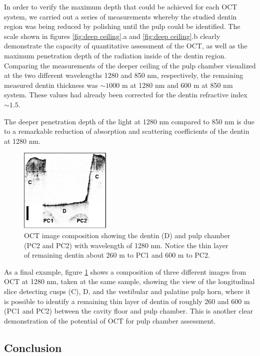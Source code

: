 \documentclass[12pt,twoside,english]{book}
\renewcommand{\~}{\perispomeni}%
\DeclareRobustCommand{\textgreek}[1]{\leavevmode{\greektext #1}}
\numberwithin{equation}{section}
\numberwithin{figure}{section}
\begin{document}
In order to verify the maximum depth that could be achieved for each OCT system, we carried out a series of measurements whereby the studied dentin region was being reduced by polishing until the pulp could be identified. The scale shown in figures \ref{fig:deep ceiling}.a and \ref{fig:deep ceiling}.b clearly demonstrate the capacity of quantitative assessment of the OCT, as well as the maximum penetration depth of the radiation inside of the dentin region. Comparing the measurements of the deeper ceiling of the pulp chamber visualized at the two different wavelengths 1280 and 850 nm, respectively, the remaining measured dentin thickness was $\sim1000$ \textgreek{m}m at 1280 nm and 600 \textgreek{m}m at 850 nm system. These values had already been corrected for the dentin refractive index $\sim1.5$\cite{Colston:1998p1677}.

The deeper penetration depth of the light at 1280 nm compared to 850 nm is due to a remarkable reduction of absorption and scattering coefficients of the dentin at 1280 nm\cite{Drexler:2004p1728}.
\begin{figure}[h]
\centering{}\includegraphics[height=4cm]{debora-6}
\caption{OCT image composition showing the dentin (D) and pulp chamber (PC2 and PC2) with wavelength of 1280 nm. Notice the thin layer of remaining dentin about 260 \textgreek{m}m to PC1 and 600 \textgreek{m}m to PC2.\label{fig:image composition}}
\end{figure}

As a final example, figure \ref{fig:image composition} shows a composition of three different images from OCT at 1280 nm, taken at the same sample, showing the view of the longitudinal slice detecting cusps (C), D, and the vestibular and palatine pulp horn, where it is possible to identify a remaining thin layer of dentin of roughly 260 and 600 \textgreek{m}m (PC1 and PC2) between the cavity floor and pulp chamber. This is another clear demonstration of the potential of OCT for pulp chamber assessment.

\subsection{Conclusion}
\end{document}
